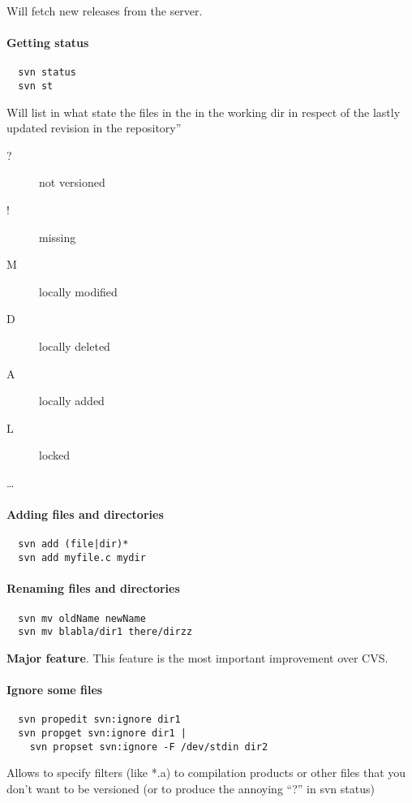 Will fetch new releases from the server.

\paragraph{Getting status}
\begin{verbatim}
  svn status
  svn st
\end{verbatim}

Will list in what state the files in the in the working dir in respect of
the lastly updated revision in the repository''

\begin{description}
\item[?] not versioned
\item[!] missing
\item[M] locally modified
\item[D] locally deleted
\item[A] locally added
\item[L] locked
\end{description}

\ldots

\paragraph{Adding files and directories}
\begin{verbatim}
  svn add (file|dir)*
  svn add myfile.c mydir
\end{verbatim}

\paragraph{Renaming files and directories}
\begin{verbatim}
  svn mv oldName newName
  svn mv blabla/dir1 there/dirzz
\end{verbatim}

\textbf{Major feature}. This feature is the most important improvement over CVS.

\paragraph{Ignore some files}
\begin{verbatim}
  svn propedit svn:ignore dir1
  svn propget svn:ignore dir1 | 
    svn propset svn:ignore -F /dev/stdin dir2
\end{verbatim}

Allows to specify filters (like *.a) to compilation products or other files
that you don't want to be versioned (or to produce the annoying ``?'' in \textsf{svn status})

